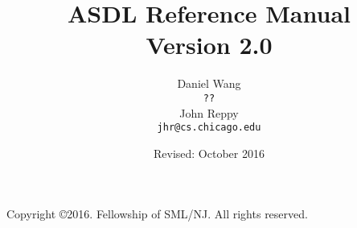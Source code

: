 \documentclass[11pt,letterpaper]{book}
\title{
  ASDL Reference Manual \\
  Version 2.0}
\author{
  Daniel Wang\\
  \texttt{??}\\[0.5em]
  John Reppy\\
  \texttt{jhr@cs.chicago.edu}}
\date{Revised: October 2016}
\begin{document}
\frontmatter

\maketitle

\phantom{.}

\noindent Copyright \copyright{}2016.  Fellowship of SML/NJ.  All rights reserved.

\vskip 12pt

\pagebreak

\tableofcontents

\mainmatter


\newpage











\backmatter



\end{document}

